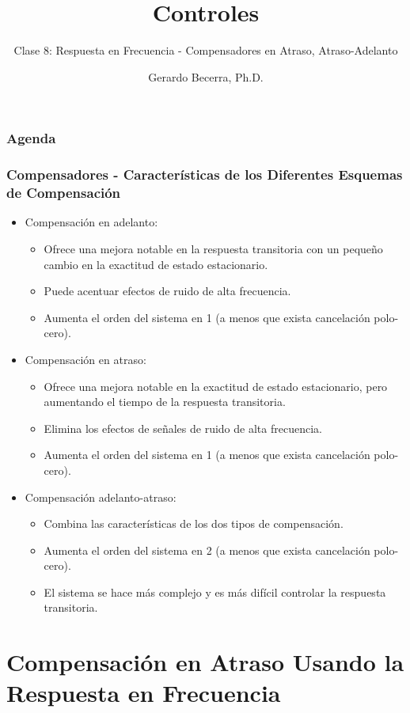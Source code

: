 \documentclass[aspectratio=169,handout]{beamer}
\title{Controles}
\subtitle{\small Clase 8: Respuesta en Frecuencia - Compensadores en Atraso, Atraso-Adelanto}
\author{Gerardo Becerra, Ph.D.}
\institute{Pontificia Universidad Javeriana\\ Departamento de Electrónica}
\date{}
\theoremstyle{definition}
\theoremstyle{plain}
\theoremstyle{remark}
\begin{document}
\frame{\titlepage}	

\begin{frame}[<+->]\frametitle{Agenda}
	\vspace{5mm}
	\tableofcontents
\end{frame}

\begin{frame}[<+->]\frametitle{Compensadores - Características de los Diferentes Esquemas de Compensación}
 	\begin{itemize}
 		\item Compensación en adelanto:
 		\begin{itemize} 
 			\item Ofrece una mejora notable en la respuesta transitoria con un pequeño cambio en la exactitud de estado estacionario.
 			\item Puede acentuar efectos de ruido de alta frecuencia.
 			\item Aumenta el orden del sistema en 1 (a menos que exista cancelación polo-cero).
 		\end{itemize}
 		\item Compensación en atraso:
 		\begin{itemize}
 			\item Ofrece una mejora notable en la exactitud de estado estacionario, pero aumentando el tiempo de la respuesta transitoria.
 			\item Elimina los efectos de señales de ruido de alta frecuencia.
 			\item Aumenta el orden del sistema en 1 (a menos que exista cancelación polo-cero).
 		\end{itemize}
 		\item Compensación adelanto-atraso:
 		\begin{itemize}
 			\item Combina las características de los dos tipos de compensación.
 			\item Aumenta el orden del sistema en 2 (a menos que exista cancelación polo-cero).
 			\item El sistema se hace más complejo y es más difícil controlar la respuesta transitoria.
 		\end{itemize}
  \end{itemize}    
\end{frame}

\section{Compensación en Atraso Usando la Respuesta en Frecuencia}
\end{document}
